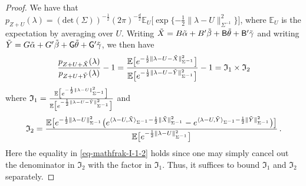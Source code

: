 \documentclass[11pt]{article}
\numberwithin{equation}{section}
\begin{document}
\begin{proof}
We have that $p_{Z+U}(\lambda) = (\mathrm{det}(\Sigma))^{-\frac{1}{2}} (2\pi)^{-\frac{d}{2}}  \mathbb{E}_{U} \big[  \exp \{  -\frac{1}{2}\| \lambda - U \|_{\Sigma^{-1}}^2 \} \big]$, where $\mathbb{E}_{U}$ is the expectation by averaging over $U$.
Writing $\Tilde{X}=B \Tilde{\alpha} + B^{\prime} \Tilde{\beta} + \mathsf{B} \Tilde{\theta} + \mathsf{B}^{\prime} \Tilde{\gamma}$ and  writing $\Tilde{Y}= G \Tilde{\alpha} + G^{\prime} \Tilde{\beta} + \mathsf{G} \Tilde{\theta} + \mathsf{G}^{\prime} \Tilde{\gamma}$, we then have
\begin{align}\label{eq-mathfrak-I-1-2}
    \frac{ p_{Z+U+ \Tilde{X}}(\lambda) }{ p_{Z+U+ \Tilde{Y}}(\lambda) } -1 = \frac{ \mathbb{E}\big[ e^{ -\frac{1}{2} \| \lambda - U - \Tilde{X} \|^2_{\Sigma^{-1}}  }  \big]  }{ \mathbb{E}\big[ e^{ -\frac{1}{2} \| \lambda - U - \Tilde{Y} \|^2_{\Sigma^{-1}} } \big] } -1  = \mathfrak I_1 \times \mathfrak I_2
    \end{align}
where $\mathfrak I_1  = \frac{ \mathbb{E}\big[ e^{-\frac{1}{2} \| \lambda - U \|^2_{\Sigma^{-1}} } \big] }{ \mathbb{E}\big[ e^{-\frac{1}{2} \| \lambda - U - \Tilde{Y} \|^2_{\Sigma^{-1}} } \big] }$ and  \label{equ-density-ratio-part-II} 
    \begin{align}
    \mathfrak I_2 =   \frac{ \mathbb{E} \big[  e^{-\frac{1}{2} \| \lambda - U \|^2_{\Sigma^{-1}} } \big( e^{ \langle \lambda-U, \Tilde{X} \rangle_{\Sigma^{-1}} - \frac{1}{2} \| \Tilde{X} \|^2_{\Sigma^{-1}} } - e^{ \langle \lambda-U, \Tilde{Y} \rangle_{\Sigma^{-1}} - \frac{1}{2} \| \Tilde{Y} \|^2_{\Sigma^{-1}} } \big) \big] }{ \mathbb{E} \big[ e^{-\frac{1}{2} \| \lambda - U \|^2_{\Sigma^{-1}} } \big] } \label{equ-density-ratio-part-I}\,.
\end{align}
Here the equality in \eqref{eq-mathfrak-I-1-2} holds since one may simply cancel out the denominator in $\mathfrak I_2$ with the factor in $\mathfrak I_1$.
Thus, it suffices to bound $\mathfrak I_1$ and $\mathfrak I_2$ separately. 


\end{proof}
\end{document}
